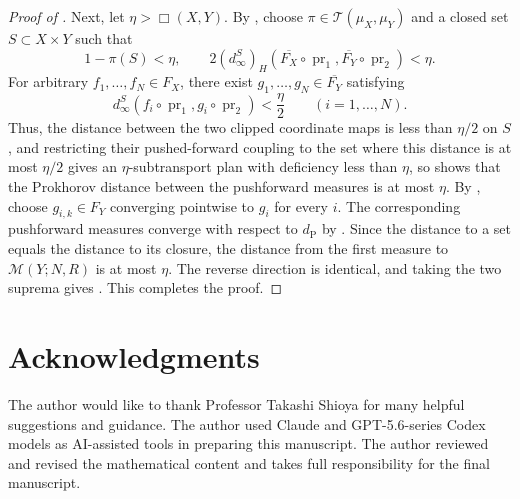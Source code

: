 \documentclass{amsart}
\theoremstyle{plain}
\theoremstyle{definition}
\theoremstyle{remark}
\newcommand{\M}{\mathcal{M}}
\DeclareMathOperator{\pr}{pr}
\newcommand{\dpr}{d_{\operatorname{P}}}
\newcommand{\dinf}[1]{d^{#1}_{\infty}}
\newcommand{\haus}[1]{\left(#1\right)_H}
\newcommand{\Tplan}{\mathcal{T}}
\begin{document}
\begin{proof}[Proof of ]
Next, let $\eta>\Box(X,Y)$. By , choose $\pi\in\Tplan(\mu_X,\mu_Y)$ and a closed set $S\subset X\times Y$ such that
\[
1-\pi(S)<\eta,\qquad
2\haus{\dinf{S}}(\overline{F_X}\circ\pr_1,\overline{F_Y}\circ\pr_2)<\eta.
\]
For arbitrary $f_1,\ldots,f_N\in F_X$, there exist $g_1,\ldots,g_N\in\overline{F_Y}$ satisfying
\[
\dinf{S}(f_i\circ\pr_1,g_i\circ\pr_2)<\frac{\eta}{2}
\qquad(i=1,\ldots,N).
\]
Thus, the distance between the two clipped coordinate maps is less than $\eta/2$ on $S$, and restricting their pushed-forward coupling to the set where this distance is at most $\eta/2$ gives an $\eta$-subtransport plan with deficiency less than $\eta$, so \cite[Theorem~1.22]{shioya2016mmg} shows that the Prokhorov distance between the pushforward measures is at most $\eta$. By , choose $g_{i,k}\in F_Y$ converging pointwise to $g_i$ for every $i$. The corresponding pushforward measures converge with respect to $\dpr$ by \cite[Lemma~1.17(1)]{shioya2016mmg}. Since the distance to a set equals the distance to its closure, the distance from the first measure to $\M(Y;N,R)$ is at most $\eta$. The reverse direction is identical, and taking the two suprema gives . This completes the proof.
\end{proof}
\section*{Acknowledgments}

The author would like to thank Professor Takashi Shioya for many helpful suggestions and guidance. The author used Claude and GPT-5.6-series Codex models as AI-assisted tools in preparing this manuscript. The author reviewed and revised the mathematical content and takes full responsibility for the final manuscript.
\end{document}
